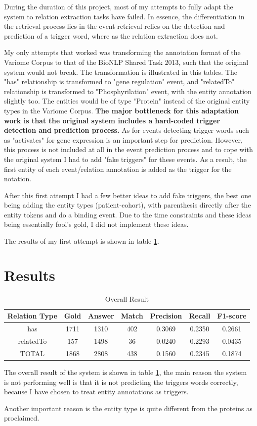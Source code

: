 During the duration of this project, most of my attempts to fully adapt the system to relation extraction tasks have failed. In essence, the differentiation in the retrieval process lies in the event retrieval relies on the detection and prediction of a trigger word, where as the relation extraction does not. 

My only attempts that worked was transforming the annotation format of the Variome Corpus to that of the BioNLP Shared Task 2013, such that the original system would not break. The transformation is illustrated in this tables. The "has" relationship is transformed to "gene regulation" event, and "relatedTo" relationship is transformed to "Phosphyrilation" event, with the entity annotation slightly too. The entities would be of type "Protein" instead of the original entity types in the Variome Corpus. \textbf{The major bottleneck for this adaptation work is that the original system includes a hard-coded trigger detection and prediction process.} As for events detecting trigger words such as "activates" for gene expression is an important step for prediction. However, this process is not included at all in the event prediction process and to cope with the original system I had to add "fake triggers" for these events. \newline
As a result, the first entity of each event/relation annotation is added as the trigger for the notation. 

After this first attempt I had a few better ideas to add fake triggers, the best one being adding the entity types (patient-cohort), with parenthesis directly after the entity tokens and do a binding event. Due to the time constraints and these ideas being essentially fool's gold, I did not implement these ideas. 

The results of my first attempt is shown in table \ref{table:overall_result}.


\section{Results}
\begin{table}
	\caption{Overall Result}
	\centering
	\label{table:overall_result}
	\begin{tabular}{|c | c c |c c c c |}
		\hline 
		{Relation Type} 
		& Gold & Answer  & Match  & Precision & Recall & F1-score\\ 
		\hline
		has  & 1711 & 1310 & 402 & 0.3069 & 0.2350 & 0.2661 \\
		
		relatedTo & 157 & 1498 &  36 & 0.0240 & 0.2293 & 0.0435\\
		\hline 
		TOTAL  & 1868 & 2808 & 438 & 0.1560 & 0.2345 & 0.1874 \\
		\hline 
	\end{tabular}
\end{table}
The overall result of the system is shown in table \ref{table:overall_result}, the main reason the system is not performing well is that it is not predicting the triggers words correctly, because I have chosen to treat entity annotations as triggers.

Another important reason is the entity type is quite different from the proteins as proclaimed. 